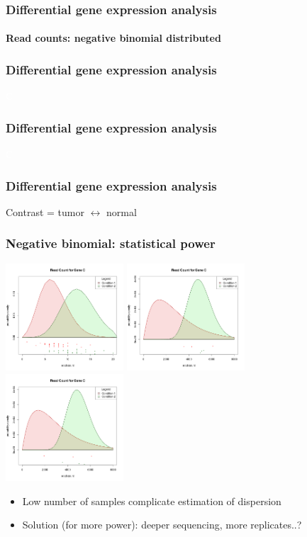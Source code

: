 \documentclass{beamer}			  %
\begin{document}
\begin{frame}
\frametitle{Differential gene expression analysis}
\framesubtitle{Read counts: negative binomial distributed}
	\begin{figure}
	\end{figure}
\end{frame}


\begin{frame}
	\frametitle{Differential gene expression analysis}
	\textcolor{white}{C}
\end{frame}

\begin{frame}
	\frametitle{Differential gene expression analysis}
	\textcolor{white}{C}
\end{frame}

\begin{frame}
	\frametitle{Differential gene expression analysis}
	Contrast = tumor $\leftrightarrow$ normal
\end{frame}

\begin{frame}
	\frametitle{Negative binomial: statistical power}
	\includegraphics[width=0.33\textwidth]{figures/dge_12ap.png}
	\includegraphics[width=0.33\textwidth]{figures/dge_12bp.png}
	\includegraphics[width=0.33\textwidth]{figures/dge_12cp.png}
	
	\begin{itemize}
		\item Low number of samples complicate estimation of dispersion
		\item Solution (for more power): deeper sequencing, more replicates..?
	\end{itemize}
\end{frame}
\end{document}
